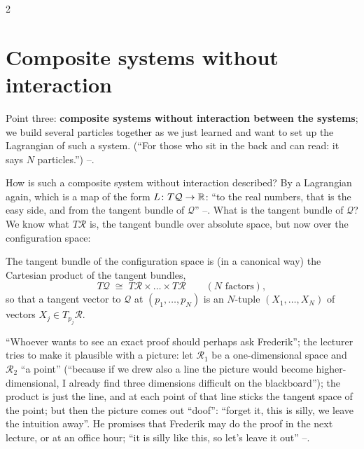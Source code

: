 \begin{paracol}{2}
\section{Composite systems without interaction}\label{sec:mp-composite}

Point three: \textbf{composite systems without interaction between the systems}; we build several particles together as we just learned and want to set up the Lagrangian of such a system. (``For those who sit in the back and can read: it says $N$ particles.'') --.

How is such a composite system without interaction described? By a Lagrangian again, which is a map of the form $L\colon T\mathcal Q\to\mathbb{R}$: ``to the real numbers, that is the easy side, and from the tangent bundle of $\mathcal Q$'' --. What is the tangent bundle of $\mathcal Q$? We know what $T\mathcal R$ is, the tangent bundle over absolute space, but now over the configuration space:

\begin{theorem}\label{thm:mp-TQ}
The tangent bundle of the configuration space is (in a canonical way) the Cartesian product of the tangent bundles,
\begin{equation}\label{eq:mp-TQ}
  T\mathcal Q\;\cong\;T\mathcal R\times\dots\times T\mathcal R\qquad(N\text{ factors}),
\end{equation}
so that a tangent vector to $\mathcal Q$ at $(p_1,\dots,p_N)$ is an $N$-tuple $(X_1,\dots,X_N)$ of vectors $X_j\in T_{p_j}\mathcal R$.
\end{theorem}

\begin{coursenote}\label{cn:mp-proof}
``Whoever wants to see an exact proof should perhaps ask Frederik''; the lecturer tries to make it plausible with a picture: let $\mathcal R_1$ be a one-dimensional space and $\mathcal R_2$ ``a point'' (``because if we drew also a line the picture would become higher-dimensional, I already find three dimensions difficult on the blackboard''); the product is just the line, and at each point of that line sticks the tangent space of the point; but then the picture comes out ``doof'': ``forget it, this is silly, we leave the intuition away''. He promises that Frederik may do the proof in the next lecture, or at an office hour; ``it is silly like this, so let's leave it out'' --.
\end{coursenote}


\end{paracol}
